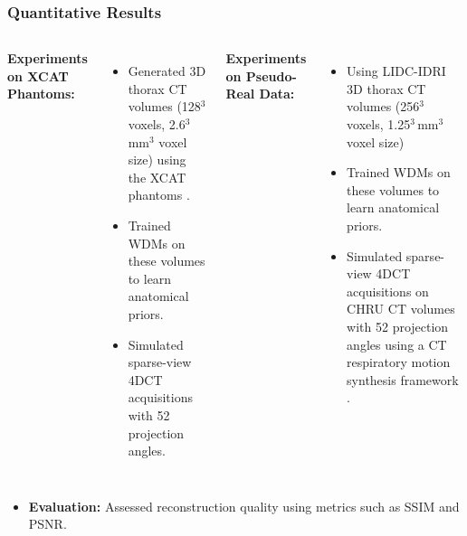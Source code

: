 \begin{frame}[t,fragile]
  \frametitle{Quantitative Results}

  \begin{columns}[T]
    \textbf{Experiments on XCAT Phantoms:}
    \begin{itemize}
      \item Generated 3D thorax CT volumes (128$^3$ voxels, 2.6$^3$\,mm$^3$ voxel size) using the XCAT phantoms \cite{segars20104d}.
      \item Trained WDMs on these volumes to learn anatomical priors.
      \item Simulated sparse-view 4DCT acquisitions with 52 projection angles.
    \end{itemize}

    \pause  %

    \textbf{Experiments on Pseudo-Real Data:}
    \begin{itemize}
      \item Using LIDC-IDRI \cite{armato2011lung} 3D thorax CT volumes (256$^3$ voxels, 1.25$^3$\,mm$^3$ voxel size)
      \item Trained WDMs on these volumes to learn anatomical priors.
      \item Simulated sparse-view 4DCT acquisitions on CHRU CT volumes with 52 projection angles using a CT respiratory motion synthesis framework \cite{cao2024ct}.
    \end{itemize}
  \end{columns}

  \pause
  \begin{itemize}
    \item \textbf{Evaluation:} Assessed reconstruction quality using metrics such as SSIM and PSNR.
  \end{itemize}
\end{frame}


